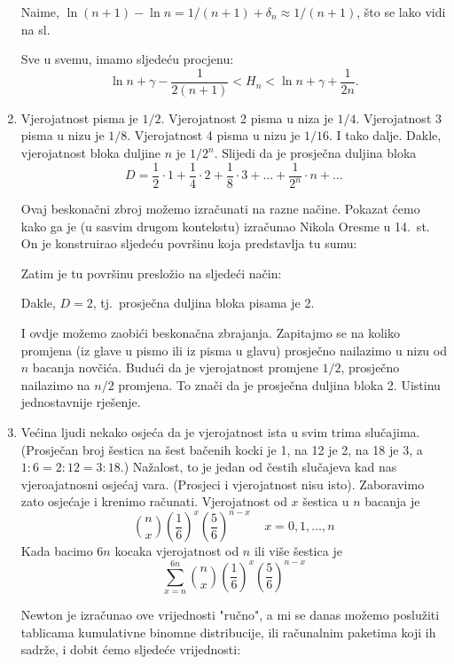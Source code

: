 \documentclass{ppclanak}
\begin{document}
\begin{enumerate}
Naime, $\ln{(n+1)} -\ln n=1/(n+1) +\delta _n \approx 1/(n+1)$,
\v{s}to se lako vidi na sl.~ 

Sve u svemu, imamo sljede\'{c}u procjenu:
\[ \ln n +\gamma - \frac{1}{2(n+1)}<H_n<\ln n +\gamma +\frac{1}{2n} .\]

\item Vjerojatnost pisma je $1/2$. Vjerojatnost 2 pisma u niza je
$1/4$. Vjerojatnost 3 pisma u nizu je $1/8$. Vjerojatnost 4 pisma
u nizu je $1/16$. I tako dalje. Dakle, vjerojatnost bloka duljine
$n$ je $1/2^n$. Slijedi da je prosje\v{c}na duljina bloka
\[D=\frac{1}{2}\cdot 1 + \frac{1}{4}\cdot 2 + \frac{1}{8}\cdot 3 +\ldots +\frac{1}{2^n}\cdot n + \ldots\]

Ovaj beskona\v{c}ni zbroj mo\v{z}emo izra\v{c}unati na razne
na\v{c}ine. Pokazat \'{c}emo kako ga je (u sasvim drugom
kontekstu) izra\v{c}unao Nikola Oresme u 14.~st. On je konstruirao
sljede\'{c}u povr\v{s}inu koja predstavlja tu sumu: 

Zatim je tu povr\v{s}inu preslo\v{z}io na sljede\'{c}i na\v{c}in:

Dakle, $D=2$, tj.~prosje\v{c}na duljina bloka pisama je 2.

I ovdje mo\v{z}emo zaobi\'{c}i beskona\v{c}na zbrajanja. Zapitajmo
se na koliko promjena (iz glave u pismo ili iz pisma u glavu)
prosje\v{c}no nailazimo u nizu od $n$ bacanja nov\v{c}i\'{c}a.
Budu\'{c}i da je vjerojatnost promjene $1/2$, prosje\v{c}no
nailazimo na $n/2$ promjena. To zna\v{c}i da je prosje\v{c}na
duljina bloka 2. Uistinu jednostavnije rje\v{s}enje.

\item Ve\'{c}ina ljudi nekako osje\'{c}a da je vjerojatnost ista u
svim trima slu\v{c}ajima. (Prosje\v{c}an broj \v{s}estica na
\v{s}est ba\v{c}enih kocki je 1, na 12 je 2, na 18 je 3, a
$1:6=2:12=3:18$.) Na\v{z}alost, to je jedan od \v{c}estih
slu\v{c}ajeva kad nas vjeroajatnosni osje\'{c}aj vara. (Prosjeci i
vjerojatnost nisu isto). Zaboravimo zato osje\'{c}aje i krenimo
ra\v{c}unati. Vjerojatnost od $x$ \v{s}estica u $n$ bacanja je
\[\binom{n}{x}\left(\frac{1}{6}\right)^x \left(\frac{5}{6}\right) ^{n-x} \;\;\;\; x=0,1,\ldots ,n \]
Kada bacimo $6n$ kocaka vjerojatnost od $n$ ili vi\v{s}e
\v{s}estica je
\[ \sum _{x=n}^{6n} \binom{n}{x}\left(\frac{1}{6}\right)^x\left(\frac{5}{6}\right)^{n-x}\]

Newton je izra\v{c}unao ove vrijednosti "ru\v{c}no", a mi se danas
mo\v{z}emo poslu\v{z}iti tablicama kumulativne binomne
distribucije, ili ra\v{c}unalnim paketima koji ih sadr\v{z}e, i
dobit \'{c}emo sljede\'{c}e vrijednosti:


\end{enumerate}
\end{document}
